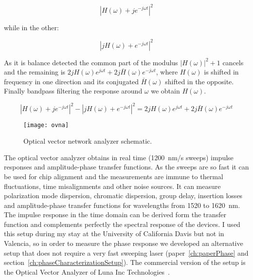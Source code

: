 \begin{equation}
	|H(\omega)+je^{-j\omega t}|^2
\end{equation} 


while in the other:

\begin{equation}
	|jH(\omega)+e^{-j\omega t}|^2
\end{equation} 


As it is balance detected the common part of the modulus $|H(\omega)|^2 + 1$ cancels and the remaining is $2j{H}(\omega)e^{j\omega t}+2j\bar{H}(\omega)e^{-j\omega t}$, where $H(\omega)$ is shifted in frequency in one direction and its conjugated $\bar{H}(\omega)$ shifted in the opposite. Finally bandpass filtering the response around $\omega$ we obtain $H(\omega)$.


\begin{equation}
	|H(\omega)+je^{-j\omega t}|^2 - |jH(\omega)+e^{-j\omega t}|^2 = 2j{H}(\omega)e^{j\omega t}+2j\bar{H}(\omega)e^{-j\omega t}
\end{equation} 

\begin{figure}[htb]
    \centering
    \texttt{[image: ovna]}
    \caption{Optical vector network analyzer schematic.}
    \label{fig:ovnaSetup}
\end{figure}


The optical vector analyzer obtains in real time (1200~nm/s sweeps) impulse responses and amplitude-phase transfer functions. As the sweeps are so fast it can be used for chip alignment and the measurements are immune to thermal fluctuations, time misalignments and other noise sources. It can measure polarization mode dispersion, chromatic dispersion, group delay, insertion losses and amplitude-phase transfer functions for wavelengths from 1520 to 1620~nm. The impulse response in the time domain can be derived form the transfer function and complements perfectly the spectral response of the devices. I used this setup during my stay at the University of California Davis but not in Valencia, so in order to measure the phase response we developed an alternative setup that does not require a very fast sweeping laser (paper~\ref{ch:paperPhase} and section~\ref{ch:phaseCharacterizationSetup}). The commercial version of the setup is the Optical Vector Analyzer of Luna Inc Technologies~\texttrademark .


\pagestyle{plain}


